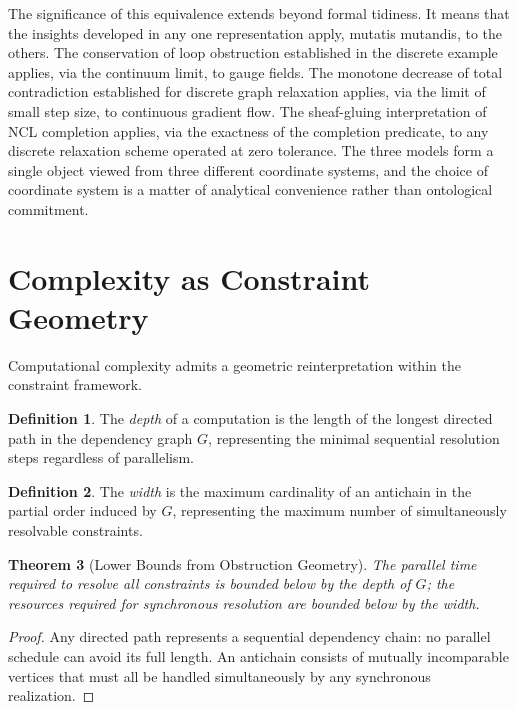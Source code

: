 \documentclass[12pt,a4paper,openany]{book}
\theoremstyle{plain}
\newtheorem{theorem}{Theorem}[chapter]
\theoremstyle{definition}
\newtheorem{definition}[theorem]{Definition}
\theoremstyle{remark}
\begin{document}
The significance of this equivalence extends beyond formal tidiness. It means that the insights developed in any one representation apply, mutatis mutandis, to the others. The conservation of loop obstruction established in the discrete example applies, via the continuum limit, to gauge fields. The monotone decrease of total contradiction established for discrete graph relaxation applies, via the limit of small step size, to continuous gradient flow. The sheaf-gluing interpretation of NCL completion applies, via the exactness of the completion predicate, to any discrete relaxation scheme operated at zero tolerance. The three models form a single object viewed from three different coordinate systems, and the choice of coordinate system is a matter of analytical convenience rather than ontological commitment.


\section{Complexity as Constraint Geometry}
\label{sec:complexity_geometry}

Computational complexity admits a geometric reinterpretation within the constraint framework.

\begin{definition}
The \emph{depth} of a computation is the length of the longest directed path in the dependency graph $G$, representing the minimal sequential resolution steps regardless of parallelism.
\end{definition}

\begin{definition}
The \emph{width} is the maximum cardinality of an antichain in the partial order induced by $G$, representing the maximum number of simultaneously resolvable constraints.
\end{definition}

\begin{theorem}[Lower Bounds from Obstruction Geometry]
The parallel time required to resolve all constraints is bounded below by the depth of $G$; the resources required for synchronous resolution are bounded below by the width.
\end{theorem}

\begin{proof}
Any directed path represents a sequential dependency chain: no parallel schedule can avoid its full length. An antichain consists of mutually incomparable vertices that must all be handled simultaneously by any synchronous realization.
\end{proof}
\end{document}
